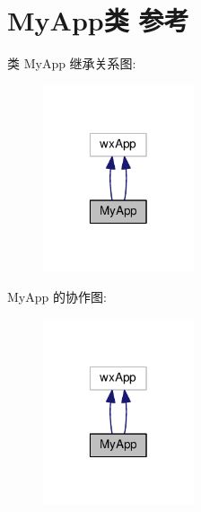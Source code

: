 \hypertarget{class_my_app}{\section{My\+App类 参考}
\label{class_my_app}
}


类 My\+App 继承关系图\+:
\nopagebreak
\begin{figure}[H]
\begin{center}
\leavevmode
\includegraphics[width=126pt]{class_my_app__inherit__graph}
\end{center}
\end{figure}


My\+App 的协作图\+:
\nopagebreak
\begin{figure}[H]
\begin{center}
\leavevmode
\includegraphics[width=126pt]{class_my_app__coll__graph}
\end{center}
\end{figure}
